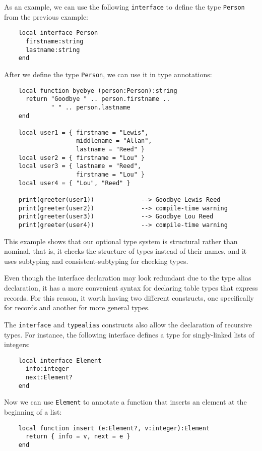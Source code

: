 As an example, we can use the following \texttt{interface} to
define the type \texttt{Person} from the previous example:
\begin{verbatim}
    local interface Person
      firstname:string
      lastname:string
    end
\end{verbatim}

After we define the type \texttt{Person}, we can use it in type annotations:
\begin{verbatim}
    local function byebye (person:Person):string
      return "Goodbye " .. person.firstname ..
             " " .. person.lastname
    end

    local user1 = { firstname = "Lewis",
                    middlename = "Allan",
                    lastname = "Reed" }
    local user2 = { firstname = "Lou" }
    local user3 = { lastname = "Reed",
                    firstname = "Lou" }
    local user4 = { "Lou", "Reed" }

    print(greeter(user1))             --> Goodbye Lewis Reed 
    print(greeter(user2))             --> compile-time warning
    print(greeter(user3))             --> Goodbye Lou Reed
    print(greeter(user4))             --> compile-time warning
\end{verbatim}

This example shows that our optional type system is structural rather
than nominal, that is, it checks the structure of types instead of
their names, and it uses subtyping and consistent-subtyping for
checking types.

Even though the interface declaration may look redundant due to
the type alias declaration, it has a more convenient syntax
for declaring table types that express records.
For this reason, it worth having two different constructs,
one specifically for records and another for more general types.

The \texttt{interface} and \texttt{typealias} constructs also allow
the declaration of recursive types.
For instance, the following interface defines a type for singly-linked
lists of integers:
\begin{verbatim}
    local interface Element
      info:integer
      next:Element?
    end
\end{verbatim}

Now we can use \texttt{Element} to annotate a function that
inserts an element at the beginning of a list:
\begin{verbatim}
    local function insert (e:Element?, v:integer):Element 
      return { info = v, next = e }
    end
\end{verbatim}

